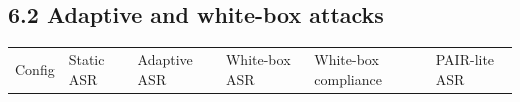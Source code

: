 \documentclass[11pt]{article}
\begin{document}
\subsection{6.2 Adaptive and white-box attacks}\label{adaptive-and-white-box-attacks}

{\def\LTcaptype{none} %

\begin{table}[t]
\centering
\small
\begin{tabular}{@{}
>{\raggedright\arraybackslash}p{}

  >{\raggedright\arraybackslash}p{}

  >{\raggedright\arraybackslash}p{}

  >{\raggedright\arraybackslash}p{}

  >{\raggedright\arraybackslash}p{}

  >{\raggedright\arraybackslash}p{}@{}}

\hline

\begin{minipage}[b]{\linewidth}\raggedright

Config

\end{minipage} & \begin{minipage}[b]{\linewidth}\raggedright

Static ASR

\end{minipage} & \begin{minipage}[b]{\linewidth}\raggedright

Adaptive ASR

\end{minipage} & \begin{minipage}[b]{\linewidth}\raggedright

White-box ASR

\end{minipage} & \begin{minipage}[b]{\linewidth}\raggedright

White-box compliance

\end{minipage} & \begin{minipage}[b]{\linewidth}\raggedright

PAIR-lite ASR


\end{minipage}
\end{tabular}
\end{table}}
\end{document}
